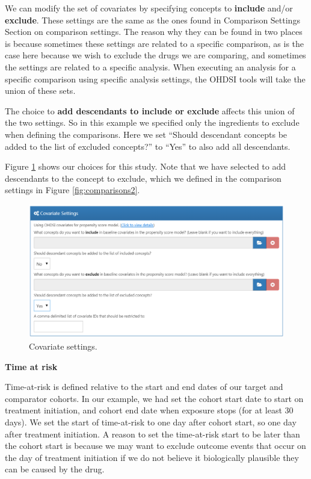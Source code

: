 \documentclass[]{book}
\begin{document}
We can modify the set of covariates by specifying concepts to \textbf{include} and/or \textbf{exclude}. These settings are the same as the ones found in Comparison Settings Section on comparison settings. The reason why they can be found in two places is because sometimes these settings are related to a specific comparison, as is the case here because we wish to exclude the drugs we are comparing, and sometimes the settings are related to a specific analysis. When executing an analysis for a specific comparison using specific analysis settings, the OHDSI tools will take the union of these sets.

The choice to \textbf{add descendants to include or exclude} affects this union of the two settings. So in this example we specified only the ingredients to exclude when defining the comparisons. Here we set ``Should descendant concepts be added to the list of excluded concepts?'' to ``Yes'' to also add all descendants.

Figure \ref{fig:covariateSettings} shows our choices for this study. Note that we have selected to add descendants to the concept to exclude, which we defined in the comparison settings in Figure \ref{fig:comparisons2}.

\begin{figure}

{\centering \includegraphics[width=1\linewidth]{images/PopulationLevelEstimation/covariateSettings} 

}

\caption{Covariate settings.}\label{fig:covariateSettings}
\end{figure}

\textbf{Time at risk}

Time-at-risk is defined relative to the start and end dates of our target and comparator cohorts. In our example, we had set the cohort start date to start on treatment initiation, and cohort end date when exposure stops (for at least 30 days). We set the start of time-at-risk to one day after cohort start, so one day after treatment initiation. A reason to set the time-at-risk start to be later than the cohort start is because we may want to exclude outcome events that occur on the day of treatment initiation if we do not believe it biologically plausible they can be caused by the drug.
\end{document}
